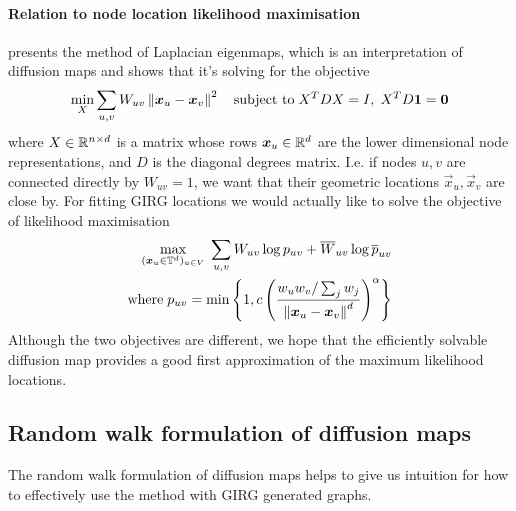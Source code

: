 \paragraph{Relation to node location likelihood maximisation}
\cite{belkin2001laplacian} presents the method of Laplacian eigenmaps, which is an interpretation of diffusion maps and shows that it's solving for the objective
\begin{equation*}
  \min_{X} \sum_{u, v} W_{uv} \left\lVert \bm{x}_u - \bm{x}_v\right\rVert^2 \quad \text{subject to}\; X^T D X = I,\; X^T D\bm{1} = \bm{0} 
\end{equation*}
where $X \in \mathbb{R}^{n \times d}$ is a  matrix whose rows $\bm{x}_u \in \mathbb{R}^d$ are the lower dimensional node representations, and $D$ is the diagonal degrees matrix. I.e. if nodes $u, v$ are connected directly by $W_{uv} = 1$, we want that their geometric locations $\vec{x}_u, \vec{x}_v$ are close by.
For fitting GIRG locations we would actually like to solve the objective of likelihood maximisation
\begin{align*}
  \max\limits_{(\bm{x}_u \in \mathbb{T}^d)_{u \in V}} \;
  \sum_{u, v} W_{uv} \log p_{uv} + \overline{W}_{uv} \log \overline{p}_{uv}
  \\
  \text{where}\; p_{uv} = \min \left \{
    1, c \left ( \frac{w_u w_v / \sum_j w_j}{\left\lVert \bm{x}_u - \bm{x}_v\right\rVert^d} \right )^\alpha
  \right \}
\end{align*}
Although the two objectives are different, we hope that the efficiently solvable diffusion map provides a good first approximation of the maximum likelihood locations.




\subsection{Random walk formulation of diffusion maps}
\label{sec:diff_maps_theory}
The random walk formulation of diffusion maps helps to give us intuition for how to effectively use the method with GIRG generated graphs.

